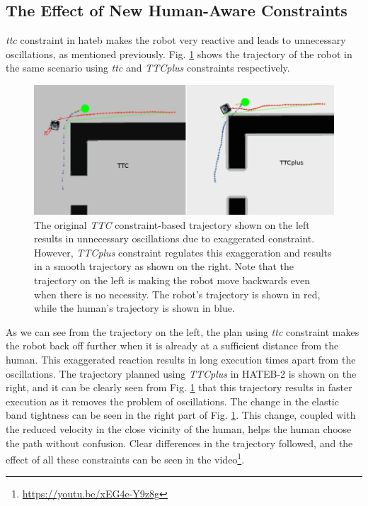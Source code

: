 \subsection{The Effect of New Human-Aware Constraints}
\textit{\acrshort{ttc}} constraint in \acrshort{hateb} makes the robot very reactive and leads to unnecessary oscillations, as mentioned previously. Fig. \ref{ttc_fig} shows the trajectory of the robot in the same scenario using \textit{\acrshort{ttc}} and \textit{TTCplus} constraints respectively.
\begin{figure}[h]
\centering
\includegraphics[width=0.8\columnwidth]{images/chapter3/ttc.png}
\caption{The original \textit{TTC} constraint-based trajectory shown on the left results in unnecessary oscillations due to exaggerated constraint. However, \textit{TTCplus} constraint regulates this exaggeration and results in a smooth trajectory as shown on the right. Note that the trajectory on the left is making the robot move backwards even when there is no necessity. The robot's trajectory is shown in red, while the human's trajectory is shown in blue.}
\label{ttc_fig}
\end{figure}
As we can see from the trajectory on the left, the plan using \textit{\acrshort{ttc}} constraint makes the robot back off further when it is already at a sufficient distance from the human. This exaggerated reaction results in long execution times apart from the oscillations. The trajectory planned using \textit{TTCplus} in HATEB-2 is shown on the right, and it can be clearly seen from Fig. \ref{ttc_fig} that this trajectory results in faster execution as it removes the problem of oscillations. The change in the elastic band tightness can be seen in the right part of Fig. \ref{ttc_fig}. This change, coupled with the reduced velocity in the close vicinity of the human, helps the human choose the path without confusion. Clear differences in the trajectory followed, and the effect of all these constraints can be seen in the video\footnote{\url{https://youtu.be/xEG4e-Y9z8g}}. 

